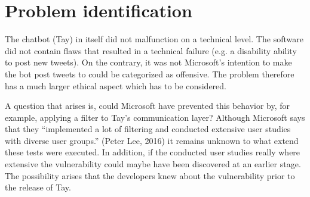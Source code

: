 \chapter{Problem identification}
The chatbot (Tay) in itself did not malfunction on a technical level. The software did not contain flaws that resulted in a technical failure
(e.g. a disability ability to post new tweets).
On the contrary, it was not Microsoft's intention to make the bot post tweets to could be categorized as offensive.
The problem therefore has a much larger ethical aspect which has to be considered.

A question that arises is, could Microsoft have prevented this behavior by, for example, applying a filter to Tay’s communication layer?
Although Microsoft says that they “implemented a lot of filtering and conducted extensive user studies with diverse user groups.” (Peter Lee, 2016)
it remains unknown to what extend these tests were executed. In addition, if the conducted user studies really where extensive the vulnerability could maybe have been discovered at an earlier stage.
The possibility arises that the developers knew about the vulnerability prior to the release of Tay.
